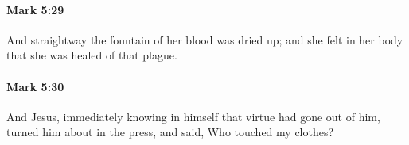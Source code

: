 		\paragraph{Mark 5:29} %
			\label{MARK-5-29}

			And straightway the fountain of her blood was dried up; and she felt in her body that she was healed of that plague.

			\begin{framed}
			\scriptsize
				\begin{compactdesc}
					\item[SBLG] 
				\end{compactdesc}
			\end{framed}

		\paragraph{Mark 5:30} %
			\label{MARK-5-30}

			And Jesus, immediately knowing in himself that virtue had gone out of him, turned him about in the press, and said, Who touched my clothes?

